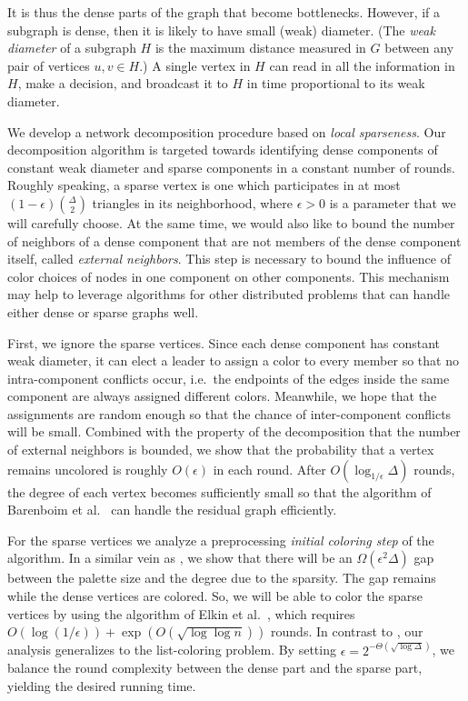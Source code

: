 \documentclass[11pt]{amsart}
\begin{document}
It is thus the dense parts of the graph that become bottlenecks. However, if a subgraph is dense, then it is likely to have small (weak) diameter. (The {\it weak diameter} of a subgraph $H$ is the maximum distance measured in $G$ between any pair of vertices $u,v \in H$.) A single vertex in $H$ can read in all the information in~$H$, make a decision, and broadcast it to $H$ in time proportional to its weak diameter.

We develop a network decomposition procedure based on \emph{local sparseness}. Our decomposition algorithm is targeted towards identifying dense components of constant weak diameter and sparse components in a constant number of rounds. Roughly speaking, a sparse vertex is one which participates in at most $(1-\epsilon) \binom{\Delta}{2}$ triangles in its neighborhood, where $\epsilon > 0$ is a parameter that we will carefully choose. At the same time, we would also like to bound the number of neighbors of a dense component that are not members of the dense component itself, called \emph{external neighbors}. This step is necessary to bound the influence of color choices of nodes in one component on other components. This mechanism may help to leverage algorithms for other distributed problems that can handle either dense or sparse graphs well.

First, we ignore the sparse vertices. Since each dense component has constant weak diameter, it can elect a leader to assign a color to every member so that no intra-component conflicts occur, i.e.~the endpoints of the edges inside the same component are always assigned different colors. Meanwhile, we hope that the assignments are random enough so that the chance of inter-component conflicts will be small.
Combined with the property of the decomposition that the number of external neighbors is bounded, we show that the probability that a vertex remains uncolored is roughly $O(\epsilon)$ in each round. After $O(\log_{1/\epsilon} \Delta)$ rounds, the degree of each vertex becomes sufficiently small so that the algorithm of Barenboim et al.~\cite{bar15a} can handle the residual graph efficiently.

For the sparse vertices we analyze a preprocessing {\it initial coloring step} of the algorithm. In a similar vein as \cite{elk15}, we show that there will be an $\Omega(\epsilon^2 \Delta)$ gap between the palette size and the degree due to the sparsity. The gap remains while the dense vertices are colored. So, we will be able to color the sparse vertices by using the algorithm of Elkin et al.~\cite{elk15}, which requires $O(\log (1/\epsilon)) + \exp(O(\sqrt{\log \log n}))$ rounds. In contrast to \cite{elk15}, our analysis generalizes to the list-coloring problem. By setting $\epsilon = 2^{-\Theta(\sqrt{\log \Delta})}$, we balance the round complexity between the dense part and the sparse part, yielding the desired running time.
\end{document}
